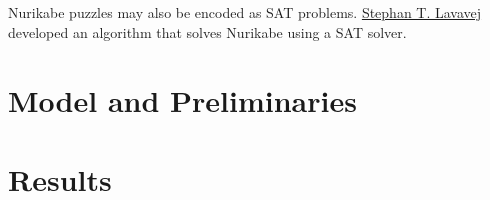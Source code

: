 \documentclass{article}
\newtheorem{theorem}{Theorem}[section]
\theoremstyle{definition}
\begin{document}
Nurikabe puzzles may also be encoded as SAT problems. \hyperlink{https://github.com/Microsoft/nurikabe}{Stephan T. Lavavej} developed an algorithm that solves Nurikabe using a SAT solver.

\section{Model and Preliminaries}



\section{Results}

\end{document}
